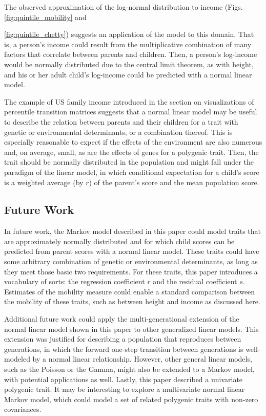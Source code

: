 \documentclass{svproc} %
\begin{document}
The observed approximation of the log-normal distribution to income (Figs. \ref{fig:quintile_mobility} and {\ref{fig:quintile_chetty}) suggests an application of the model to this domain. That is, a person's income could result from the multiplicative combination of many factors that correlate between parents and children. Then, a person's log-income would be normally distributed due to the central limit theorem, as with height, and his or her adult child's log-income could be predicted with a normal linear model.

The example of US family income introduced in the section on visualizations of percentile transition matrices suggests that a normal linear model may be useful to describe the relation between parents and their children for a trait with genetic or environmental determinants, or a combination thereof. This is especially reasonable to expect if the effects of the environment are also numerous and, on average, small, as are the effects of genes for a polygenic trait. Then, the trait should be normally distributed in the population and might fall under the paradigm of the linear model, in which conditional expectation for a child's score is a weighted average (by $r$) of the parent's score and the mean population score. 

\subsection{Future Work}

In future work, the Markov model described in this paper could model traits that are approximately normally distributed and for which child scores can be predicted from parent scores with a normal linear model. These traits could have some arbitrary combination of genetic or environmental determinants, as long as they meet those basic two requirements. For these traits, this paper introduces a vocabulary of sorts: the regression coefficient $r$ and the residual coefficient $s$. Estimates of the mobility measure could enable a standard comparison between the mobility of these traits, such as between height and income as discussed here. 


Additional future work could apply the multi-generational extension of the normal linear model shown in this paper to other generalized linear models. This extension was justified for describing a population that reproduces between generations, in which the forward one-step transition between generations is well-modeled by a normal linear relationship. However, other general linear models, such as the Poisson or the Gamma, might also be extended to a Markov model, with potential applications as well. Lastly, this paper described a univariate polygenic trait. It may be interesting to explore a multivariate normal linear Markov model, which could model a set of related polygenic traits with non-zero covariances. 


}
\end{document}

